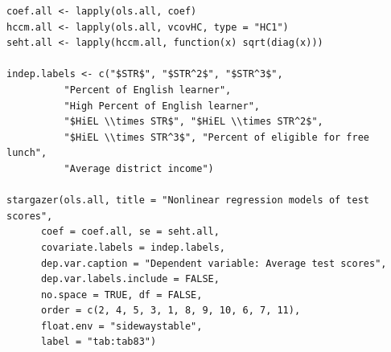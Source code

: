 \documentclass[11pt]{article}
\begin{document}
\begin{verbatim}
coef.all <- lapply(ols.all, coef)
hccm.all <- lapply(ols.all, vcovHC, type = "HC1")
seht.all <- lapply(hccm.all, function(x) sqrt(diag(x)))

indep.labels <- c("$STR$", "$STR^2$", "$STR^3$",
		  "Percent of English learner",
		  "High Percent of English learner",
		  "$HiEL \\times STR$", "$HiEL \\times STR^2$",
		  "$HiEL \\times STR^3$", "Percent of eligible for free lunch",
		  "Average district income")

stargazer(ols.all, title = "Nonlinear regression models of test scores",
	  coef = coef.all, se = seht.all,
	  covariate.labels = indep.labels,
	  dep.var.caption = "Dependent variable: Average test scores",
	  dep.var.labels.include = FALSE,
	  no.space = TRUE, df = FALSE,
	  order = c(2, 4, 5, 3, 1, 8, 9, 10, 6, 7, 11),
	  float.env = "sidewaystable",
	  label = "tab:tab83")
\end{verbatim}
\end{document}
